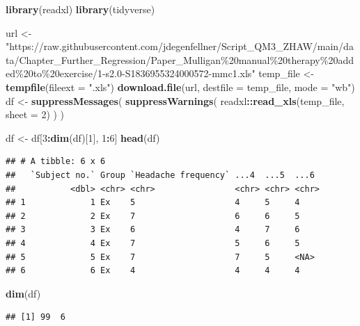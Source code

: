 \documentclass[
]{book}
\newenvironment{Shaded}{\begin{snugshade}}{\end{snugshade}}
\newcommand{\AttributeTok}[1]{\textcolor[rgb]{0.13,0.29,0.53}{#1}}
\newcommand{\DecValTok}[1]{\textcolor[rgb]{0.00,0.00,0.81}{#1}}
\newcommand{\FunctionTok}[1]{\textcolor[rgb]{0.13,0.29,0.53}{\textbf{#1}}}
\newcommand{\NormalTok}[1]{#1}
\newcommand{\OtherTok}[1]{\textcolor[rgb]{0.56,0.35,0.01}{#1}}
\newcommand{\SpecialCharTok}[1]{\textcolor[rgb]{0.81,0.36,0.00}{\textbf{#1}}}
\newcommand{\StringTok}[1]{\textcolor[rgb]{0.31,0.60,0.02}{#1}}
\begin{document}
\begin{Shaded}
\begin{Highlighting}[]
\FunctionTok{library}\NormalTok{(readxl)}
\FunctionTok{library}\NormalTok{(tidyverse)}

\NormalTok{url }\OtherTok{\textless{}{-}} \StringTok{"https://raw.githubusercontent.com/jdegenfellner/Script\_QM3\_ZHAW/main/data/Chapter\_Further\_Regression/Paper\_Mulligan\%20manual\%20therapy\%20added\%20to\%20exercise/1{-}s2.0{-}S1836955324000572{-}mmc1.xls"}
\NormalTok{temp\_file }\OtherTok{\textless{}{-}} \FunctionTok{tempfile}\NormalTok{(}\AttributeTok{fileext =} \StringTok{".xls"}\NormalTok{)}
\FunctionTok{download.file}\NormalTok{(url, }\AttributeTok{destfile =}\NormalTok{ temp\_file, }\AttributeTok{mode =} \StringTok{"wb"}\NormalTok{)}
\NormalTok{df }\OtherTok{\textless{}{-}} \FunctionTok{suppressMessages}\NormalTok{(}
  \FunctionTok{suppressWarnings}\NormalTok{(}
\NormalTok{    readxl}\SpecialCharTok{::}\FunctionTok{read\_xls}\NormalTok{(temp\_file, }\AttributeTok{sheet =} \DecValTok{2}\NormalTok{)}
\NormalTok{  )}
\NormalTok{)}

\NormalTok{df }\OtherTok{\textless{}{-}}\NormalTok{ df[}\DecValTok{3}\SpecialCharTok{:}\FunctionTok{dim}\NormalTok{(df)[}\DecValTok{1}\NormalTok{], }\DecValTok{1}\SpecialCharTok{:}\DecValTok{6}\NormalTok{]}
\FunctionTok{head}\NormalTok{(df)}
\end{Highlighting}
\end{Shaded}

\begin{verbatim}
## # A tibble: 6 x 6
##   `Subject no.` Group `Headache frequency` ...4  ...5  ...6 
##           <dbl> <chr> <chr>                <chr> <chr> <chr>
## 1             1 Ex    5                    4     5     4    
## 2             2 Ex    7                    6     6     5    
## 3             3 Ex    6                    4     7     6    
## 4             4 Ex    7                    5     6     5    
## 5             5 Ex    7                    7     5     <NA> 
## 6             6 Ex    4                    4     4     4
\end{verbatim}

\begin{Shaded}
\begin{Highlighting}[]
\FunctionTok{dim}\NormalTok{(df)}
\end{Highlighting}
\end{Shaded}

\begin{verbatim}
## [1] 99  6
\end{verbatim}
\end{document}
